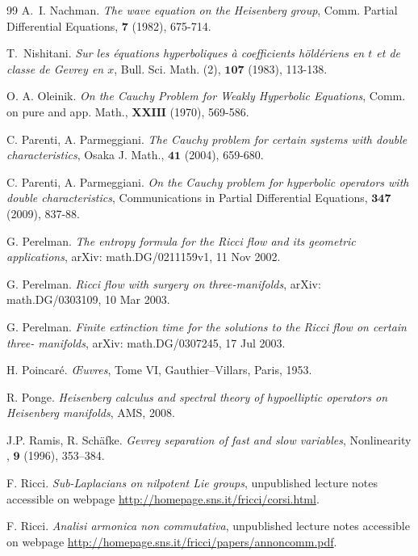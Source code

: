 \documentclass[12pt,oneside,a4paper]{book}
\numberwithin{equation}{section}     %
\theoremstyle{plain}
\theoremstyle{definition}
\begin{document}
\begin{thebibliography}{99}
	A.~I. Nachman.
	\emph{The wave equation on the {H}eisenberg group},
	Comm. Partial Differential Equations, $\mathbf{7}$ (1982), 675-714.
	
	T.~Nishitani.
	\emph{Sur les {\'e}quations hyperboliques {\`a} coefficients h{\"o}ld{\'e}riens en {$t$} et de classe de {G}evrey en {$x$}},
	Bull. Sci. Math. (2), $\mathbf{107}$ (1983), 113-138.
	
	O. A. Oleinik.
	\emph{On the Cauchy Problem for Weakly Hyperbolic Equations},
	Comm. on pure and app. Math., $\mathbf{XXIII}$ (1970), 569-586.
	
	C. Parenti, A. Parmeggiani. 
	\emph{The Cauchy problem for certain systems with double characteristics},
	Osaka J. Math., $\mathbf{41}$ (2004), 659-680.
	
	C. Parenti, A. Parmeggiani. 
	\emph{On the Cauchy problem for hyperbolic operators with double characteristics}, 
	Communications in Partial Differential Equations, $\mathbf{347}$ (2009), 837-88.
	
	G. Perelman.
	\emph{The entropy formula for the Ricci flow and its geometric applications},
	arXiv: math.DG/0211159v1, 11 Nov 2002.
	
	G. Perelman.
	\emph{Ricci flow with surgery on three-manifolds},
	arXiv: math.DG/0303109, 10 Mar 2003.
	
	G. Perelman.
	\emph{Finite extinction time for the solutions to the Ricci flow on certain three-
		manifolds},
	arXiv: math.DG/0307245, 17 Jul 2003.
	
	H. Poincar\'e.
	\emph{\OE uvres}, Tome VI, Gauthier--Villars, Paris, 1953.
	
	R. Ponge.
	\emph{Heisenberg calculus and spectral theory of hypoelliptic operators on Heisenberg manifolds},
	AMS, 2008.
	
	J.P. Ramis, R. Schäfke.
	\emph{Gevrey separation of fast and slow variables},
	Nonlinearity , $\mathbf{9}$ (1996), 353–384.
	
	F. Ricci.
	\emph{Sub-Laplacians on nilpotent Lie groups},
	unpublished lecture notes accessible on webpage \url{http://homepage.sns.it/fricci/corsi.html}.
	
	F. Ricci.
	\emph{Analisi armonica non commutativa},
	unpublished lecture notes accessible on webpage \url{http://homepage.sns.it/fricci/papers/annoncomm.pdf}.
	

\end{thebibliography}
\end{document}
